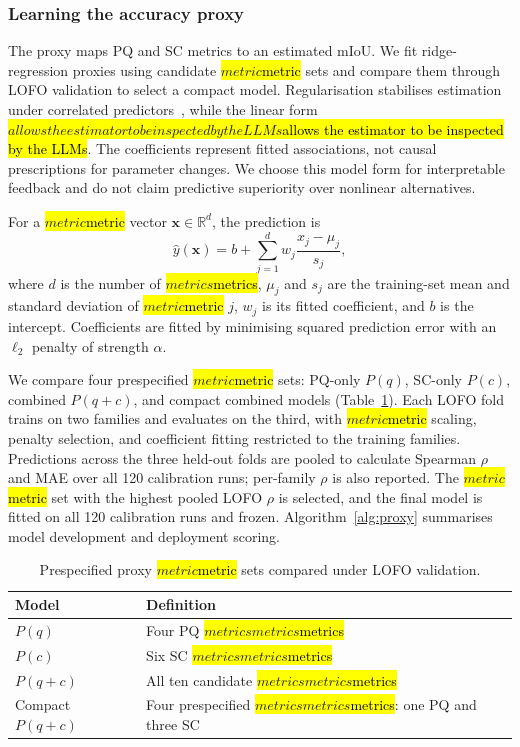\documentclass[a4paper,fleqn]{cas-dc}
\let\texthl\hl
\renewcommand{\hl}[1]{\ifmmode\colorbox{yellow}{\ensuremath{#1}}\else\texthl{#1}\fi}
\begin{document}
\subsubsection{Learning the accuracy proxy}
\label{sec:ridge-proxy}

The proxy maps PQ and SC metrics to an estimated mIoU. We fit ridge-regression proxies using candidate \hl{metric} sets and compare them through LOFO validation to select a compact model. Regularisation stabilises estimation under correlated predictors~\cite{hoerl1970ridge,pedregosa2011sklearn}, while the linear form \hl{allows the estimator to be inspected by the LLMs}. The coefficients represent fitted associations, not causal prescriptions for parameter changes. We choose this model form for interpretable feedback and do not claim predictive superiority over nonlinear alternatives.

For a \hl{metric} vector $\mathbf{x}\in\mathbb{R}^{d}$, the prediction is
\begin{equation}
\hat{y}(\mathbf{x})
=
b+\sum_{j=1}^{d}
w_j\frac{x_j-\mu_j}{s_j},
\label{eq:ridge-proxy}
\end{equation}
where $d$ is the number of \hl{metrics}, $\mu_j$ and $s_j$ are the training-set mean and standard deviation of \hl{metric} $j$, $w_j$ is its fitted coefficient, and $b$ is the intercept. Coefficients are fitted by minimising squared prediction error with an $\ell_2$ penalty of strength $\alpha$.

We compare four prespecified \hl{metric} sets: PQ-only $P(q)$, SC-only $P(c)$, combined $P(q{+}c)$, and compact combined models (Table~\ref{tab:proxy-ablation}). Each LOFO fold trains on two families and evaluates on the third, with \hl{metric} scaling, penalty selection, and coefficient fitting restricted to the training families. Predictions across the three held-out folds are pooled to calculate Spearman $\rho$ and MAE over all 120 calibration runs; per-family $\rho$ is also reported. The \hl{metric} set with the highest pooled LOFO $\rho$ is selected, and the final model is fitted on all 120 calibration runs and frozen. Algorithm~\ref{alg:proxy} summarises model development and deployment scoring.

\begin{table}[ht]
\caption{Prespecified proxy \hl{metric} sets compared under LOFO validation.}
\label{tab:proxy-ablation}
\centering
\begin{tabular}{p{} p{}}
\toprule
Model & Definition \\
\midrule
$P(q)$ & Four PQ \hl{metrics} \\
$P(c)$ & Six SC \hl{metrics} \\
$P(q{+}c)$ & All ten candidate \hl{metrics} \\
Compact $P(q{+}c)$ & Four prespecified \hl{metrics}: one PQ and three SC \\
\bottomrule
\end{tabular}
\end{table}
\end{document}
